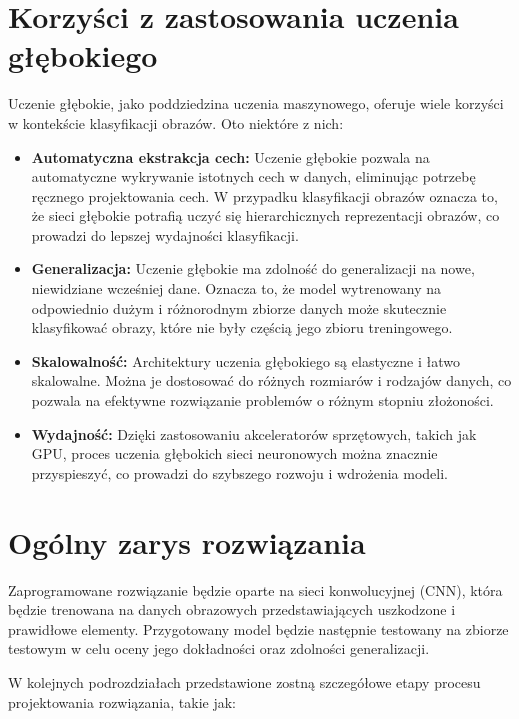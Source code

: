 \section{Korzyści z zastosowania uczenia głębokiego}
Uczenie głębokie, jako poddziedzina uczenia maszynowego, oferuje wiele korzyści w kontekście klasyfikacji obrazów. Oto niektóre z nich:

\begin{itemize}
\item \textbf{Automatyczna ekstrakcja cech:} Uczenie głębokie pozwala na automatyczne wykrywanie istotnych cech w danych, eliminując potrzebę ręcznego projektowania cech. W przypadku klasyfikacji obrazów oznacza to, że sieci głębokie potrafią uczyć się hierarchicznych reprezentacji obrazów, co prowadzi do lepszej wydajności klasyfikacji.

\item \textbf{Generalizacja:} Uczenie głębokie ma zdolność do generalizacji na nowe, niewidziane wcześniej dane. Oznacza to, że model wytrenowany na odpowiednio dużym i różnorodnym zbiorze danych może skutecznie klasyfikować obrazy, które nie były częścią jego zbioru treningowego.

\item \textbf{Skalowalność:} Architektury uczenia głębokiego są elastyczne i łatwo skalowalne. Można je dostosować do różnych rozmiarów i rodzajów danych, co pozwala na efektywne rozwiązanie problemów o różnym stopniu złożoności.

\item \textbf{Wydajność:} Dzięki zastosowaniu akceleratorów sprzętowych, takich jak GPU, proces uczenia głębokich sieci neuronowych można znacznie przyspieszyć, co prowadzi do szybszego rozwoju i wdrożenia modeli.

\end{itemize}

\section{Ogólny zarys rozwiązania}
Zaprogramowane rozwiązanie będzie oparte na sieci konwolucyjnej (CNN), która będzie trenowana na danych obrazowych przedstawiających uszkodzone i prawidłowe elementy. Przygotowany model będzie następnie testowany na zbiorze testowym w celu oceny jego dokładności oraz zdolności generalizacji.

W kolejnych podrozdziałach przedstawione zostną szczegółowe etapy procesu projektowania rozwiązania, takie jak:

